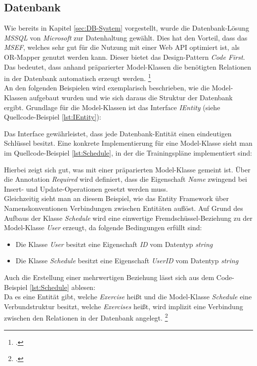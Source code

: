 \subsection{Datenbank}
\label{ssec:aufbau-server-db}
Wie bereits in Kapitel \ref{sec:DB-System} vorgestellt, wurde die Datenbank-Lösung \textit{\ac{MSSQL}} von \textit{Microsoft} zur Datenhaltung gewählt. Dies hat den Vorteil, dass das \textit{\gls{MSEF}}, welches sehr gut für die Nutzung mit einer Web \ac{API} optimiert ist, als \gls{OR-Mapper} genutzt werden kann. Dieser bietet das Design-Pattern \textit{Code First}. Das bedeutet, dass anhand präparierter Model-Klassen die benötigten Relationen in der Datenbank automatisch erzeugt werden. \footcite{entity-framework-code-first}\\
An den folgenden Beispielen wird exemplarisch beschrieben, wie die Model-Klassen aufgebaut wurden und wie sich daraus die Struktur der Datenbank ergibt. Grundlage für die Model-Klassen ist das Interface \textit{IEntity} (siehe Quellcode-Beispiel \ref{lst:IEntity}):

Das Interface gewährleistet, dass jede Datenbank-Entität einen eindeutigen Schlüssel besitzt.
Eine konkrete Implementierung für eine Model-Klasse sieht man im \linebreak Quellcode-Beispiel \ref{lst:Schedule}, in der die Trainingspläne implementiert sind:

Hierbei zeigt sich gut, was mit einer präparierten Model-Klasse gemeint ist. Über die Annotation \textit{Required} wird definiert, dass die Eigenschaft \textit{Name} zwingend bei Insert- und Update-Operationen gesetzt werden muss. \\
Gleichzeitig sieht man an diesem Beispiel, wie das Entity Framework über Namenskonventionen Verbindungen zwischen Entitäten auflöst. Auf Grund des Aufbaus der Klasse \textit{Schedule} wird eine einwertige Fremdschüssel-Beziehung zu der Model-Klasse \textit{User} erzeugt, da folgende Bedingungen erfüllt sind:
\begin{itemize}
\item Die Klasse \textit{User} besitzt eine Eigenschaft \textit{ID} vom Datentyp \textit{string}
\item Die Klasse \textit{Schedule} besitzt eine Eigenschaft \textit{UserID} vom Datentyp \textit{string}
\end{itemize}
Auch die Erstellung einer mehrwertigen Beziehung lässt sich aus dem Code-Beispiel \ref{lst:Schedule} ablesen: \\
Da es eine Entität gibt, welche \textit{Exercise} heißt und die Model-Klasse \textit{Schedule} eine Verbundstruktur besitzt, welche \textit{Exercises} heißt, wird implizit eine Verbindung zwischen den Relationen in der Datenbank angelegt. \footcite{entity-framework-code-first}
